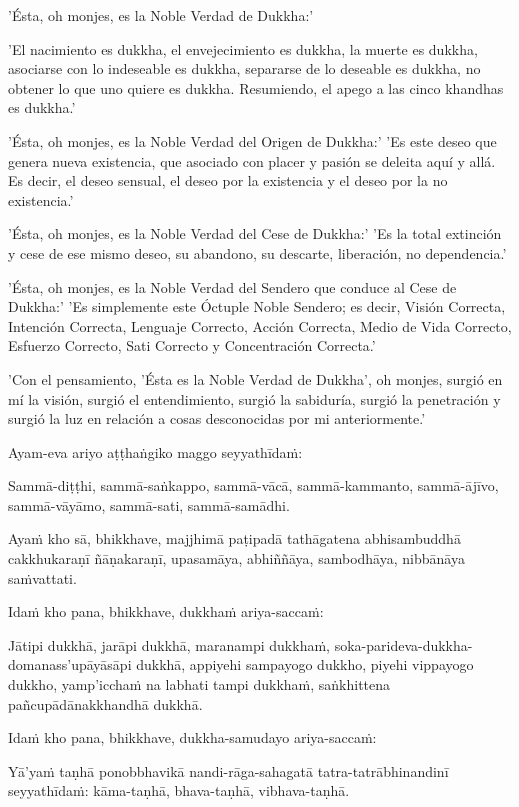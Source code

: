 'Ésta, oh monjes, es la Noble Verdad de Dukkha:'

'El nacimiento es dukkha, el envejecimiento es dukkha, la muerte es dukkha, asociarse con lo indeseable es dukkha, separarse de lo deseable es dukkha, no obtener lo que uno quiere es dukkha. Resumiendo, el apego a las cinco khandhas es dukkha.'

'Ésta, oh monjes, es la Noble Verdad del Origen de Dukkha:'
'Es este deseo que genera nueva existencia, que asociado con placer y pasión se deleita aquí y allá. Es decir, el deseo sensual, el deseo por la existencia y el deseo por la no existencia.'

'Ésta, oh monjes, es la Noble Verdad del Cese de Dukkha:'
'Es la total extinción y cese de ese mismo deseo, su abandono, su descarte, liberación, no dependencia.'

'Ésta, oh monjes, es la Noble Verdad del Sendero que conduce al Cese de Dukkha:'
'Es simplemente este Óctuple Noble Sendero; es decir, Visión Correcta, Intención Correcta, Lenguaje Correcto, Acción Correcta, Medio de Vida Correcto, Esfuerzo Correcto, Sati Correcto y Concentración Correcta.'

'Con el pensamiento, 'Ésta es la Noble Verdad de Dukkha', oh monjes, surgió en mí la visión, surgió el entendimiento, surgió la sabiduría, surgió la penetración y surgió la luz en relación a cosas desconocidas por mi anteriormente.'

\clearpage

\paliText
\markboth{\paliTitle}{\rightmark}

Ayam-eva ariyo aṭṭhaṅgiko maggo seyyathīdaṁ:

Sammā-diṭṭhi, sammā-saṅkappo, sammā-vācā, sammā-kammanto, sammā-ājīvo,
sammā-vāyāmo, sammā-sati, sammā-samādhi.

Ayaṁ kho sā, bhikkhave, majjhimā paṭipadā tathāgatena abhisambuddhā
cakkhukaraṇī ñāṇakaraṇī, upasamāya, abhiññāya, sambodhāya, nibbānāya
saṁvattati.

Idaṁ kho pana, bhikkhave, dukkhaṁ ariya-saccaṁ:

Jātipi dukkhā, jarāpi dukkhā, maranampi dukkhaṁ,
soka-parideva-dukkha-domanass'upāyāsāpi dukkhā, appiyehi sampayogo
dukkho, piyehi vippayogo dukkho, yamp'icchaṁ na labhati tampi dukkhaṁ,
saṅkhittena pañcupādānakkhandhā dukkhā.

Idaṁ kho pana, bhikkhave, dukkha-samudayo ariya-saccaṁ:

Yā'yaṁ taṇhā ponobbhavikā nandi-rāga-sahagatā tatra-tatrābhinandinī
seyyathīdaṁ: kāma-taṇhā, bhava-taṇhā, vibhava-taṇhā.

